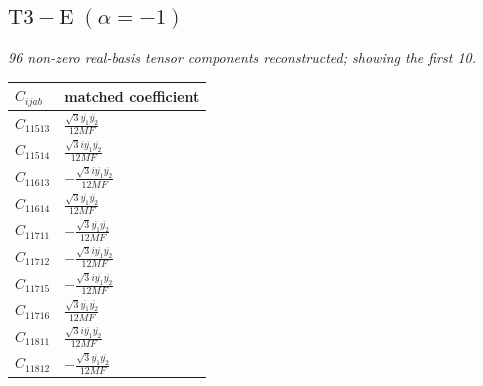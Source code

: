 \documentclass[9pt]{article}
\begin{document}
\subsection*{$ \mathrm{T3-E}\;(\alpha=-1) $}
\textit{96 non-zero real-basis tensor components reconstructed; showing the first 10.}
\begin{longtable}{@{}ll@{}}
\toprule
$C_{ijab}$ & matched coefficient \\
\midrule
$C_{11513}$ & $ \frac{\sqrt{3} \overline{y_{1}} \overline{y_{2}}}{12 MF} $ \\
$C_{11514}$ & $ \frac{\sqrt{3} i \overline{y_{1}} \overline{y_{2}}}{12 MF} $ \\
$C_{11613}$ & $ - \frac{\sqrt{3} i \overline{y_{1}} \overline{y_{2}}}{12 MF} $ \\
$C_{11614}$ & $ \frac{\sqrt{3} \overline{y_{1}} \overline{y_{2}}}{12 MF} $ \\
$C_{11711}$ & $ - \frac{\sqrt{3} \overline{y_{1}} \overline{y_{2}}}{12 MF} $ \\
$C_{11712}$ & $ - \frac{\sqrt{3} i \overline{y_{1}} \overline{y_{2}}}{12 MF} $ \\
$C_{11715}$ & $ - \frac{\sqrt{3} i \overline{y_{1}} \overline{y_{2}}}{12 MF} $ \\
$C_{11716}$ & $ \frac{\sqrt{3} \overline{y_{1}} \overline{y_{2}}}{12 MF} $ \\
$C_{11811}$ & $ \frac{\sqrt{3} i \overline{y_{1}} \overline{y_{2}}}{12 MF} $ \\
$C_{11812}$ & $ - \frac{\sqrt{3} \overline{y_{1}} \overline{y_{2}}}{12 MF} $ \\
\bottomrule
\end{longtable}
\end{document}
